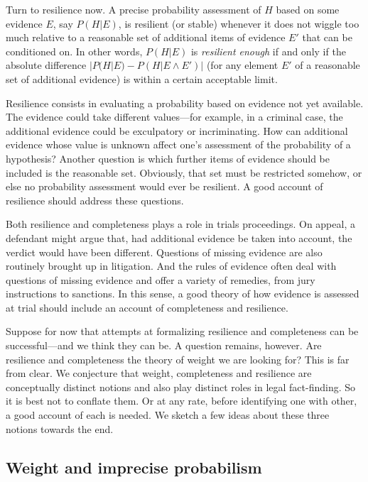 \documentclass[
  10pt,
  dvipsnames,enabledeprecatedfontcommands]{scrartcl}
\begin{document}
Turn to resilience now. A precise probability assessment of \(H\) based
on some evidence \(E\), say \(P(H \vert E)\), is resilient (or stable)
whenever it does not wiggle too much relative to a reasonable set of
additional items of evidence \(E'\) that can be conditioned on. In other
words, \(P(H \vert E)\) is \emph{resilient enough} if and only if the
absolute difference \(| P(H | E) - P(H \vert E \wedge E')|\) (for any
element \(E'\) of a reasonable set of additional evidence) is within a
certain acceptable limit.

Resilience consists in evaluating a probability based on evidence not
yet available. The evidence could take different values---for example,
in a criminal case, the additional evidence could be exculpatory or
incriminating. How can additional evidence whose value is unknown affect
one's assessment of the probability of a hypothesis? Another question is
which further items of evidence should be included is the reasonable
set. Obviously, that set must be restricted somehow, or else no
probability assessment would ever be resilient. A good account of
resilience should address these questions.

Both resilience and completeness plays a role in trials proceedings. On
appeal, a defendant might argue that, had additional evidence be taken
into account, the verdict would have been different. Questions of
missing evidence are also routinely brought up in litigation. And the
rules of evidence often deal with questions of missing evidence and
offer a variety of remedies, from jury instructions to sanctions. In
this sense, a good theory of how evidence is assessed at trial should
include an account of completeness and resilience.

Suppose for now that attempts at formalizing resilience and completeness
can be successful---and we think they can be. A question remains,
however. Are resilience and completeness the theory of weight we are
looking for? This is far from clear. We conjecture that weight,
completeness and resilience are conceptually distinct notions and also
play distinct roles in legal fact-finding. So it is best not to conflate
them. Or at any rate, before identifying one with other, a good account
of each is needed. We sketch a few ideas about these three notions
towards the end.

\hypertarget{weight-and-imprecise-probabilism}{%
\subsection{Weight and imprecise
probabilism}\label{weight-and-imprecise-probabilism}}
\end{document}
